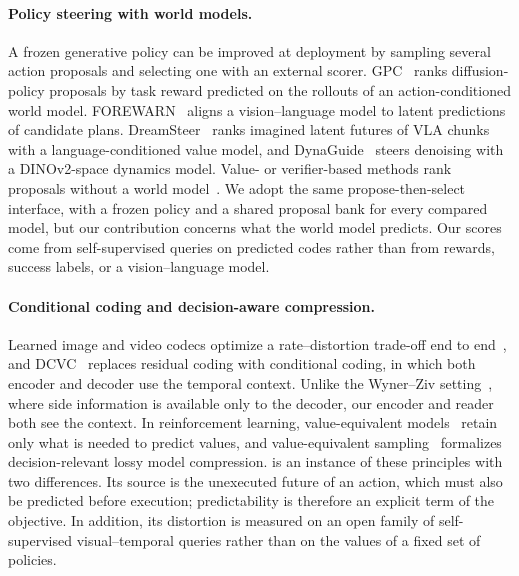 \paragraph{Policy steering with world models.}
A frozen generative policy can be improved at deployment by sampling several action proposals and selecting one with an external scorer.
GPC~\cite{qi2025gpc} ranks diffusion-policy proposals by task reward predicted on the rollouts of an action-conditioned world model.
FOREWARN~\cite{wu2025forewarn} aligns a vision--language model to latent predictions of candidate plans.
DreamSteer~\cite{cui2026dreamsteer} ranks imagined latent futures of VLA chunks with a language-conditioned value model, and DynaGuide~\cite{du2025dynaguide} steers denoising with a DINOv2-space dynamics model.
Value- or verifier-based methods rank proposals without a world model~\cite{nakamoto2024vgps,kwok2025robomonkey}.
We adopt the same propose-then-select interface, with a frozen policy and a shared proposal bank for every compared model, but our contribution concerns what the world model predicts.
Our scores come from self-supervised queries on predicted codes rather than from rewards, success labels, or a vision--language model.

\paragraph{Conditional coding and decision-aware compression.}
Learned image and video codecs optimize a rate--distortion trade-off end to end~\cite{balle2017end}, and DCVC~\cite{li2021dcvc} replaces residual coding with conditional coding, in which both encoder and decoder use the temporal context.
Unlike the Wyner--Ziv setting~\cite{wyner1976ratedistortion}, where side information is available only to the decoder, our encoder and reader both see the context.
In reinforcement learning, value-equivalent models~\cite{grimm2020value,schrittwieser2020muzero} retain only what is needed to predict values, and value-equivalent sampling~\cite{arumugam2022deciding} formalizes decision-relevant lossy model compression.
\method is an instance of these principles with two differences.
Its source is the unexecuted future of an action, which must also be predicted before execution; predictability is therefore an explicit term of the objective.
In addition, its distortion is measured on an open family of self-supervised visual--temporal queries rather than on the values of a fixed set of policies.

